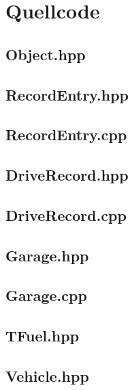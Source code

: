 \documentclass[12pt,naustrian,a4widepaper]{scrartcl}
\begin{document}
\clearpage
\section{Quellcode}

\subsection{Object.hpp}


\subsection{RecordEntry.hpp}


\subsection{RecordEntry.cpp}


\subsection{DriveRecord.hpp}


\subsection{DriveRecord.cpp}


\subsection{Garage.hpp}


\subsection{Garage.cpp}


\subsection{TFuel.hpp}


\subsection{Vehicle.hpp}

\end{document}
